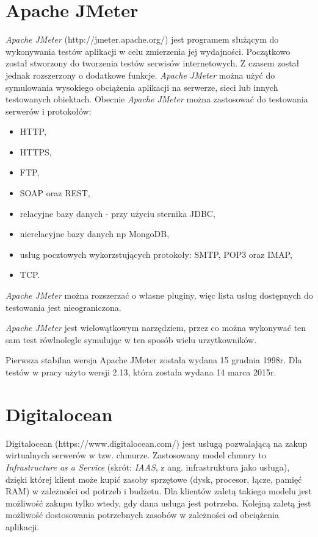 \section{Apache JMeter}
\textsl{Apache JMeter} (http://jmeter.apache.org/) jest programem służącym do wykonywania testów aplikacji w celu zmierzenia jej wydajności. Początkowo został stworzony do tworzenia testów serwisów internetowych. Z czasem został jednak rozszerzony o dodatkowe funkcje. \textsl{Apache JMeter} można użyć do symulowania wysokiego obciążenia aplikacji na serwerze, sieci lub innych testowanych obiektach.
Obecnie \textsl{Apache JMeter} można zastosować do testowania serwerów i protokołów:
\begin{itemize}
\item HTTP,
\item HTTPS,
\item FTP,
\item SOAP oraz REST,
\item relacyjne bazy danych - przy użyciu sternika JDBC,
\item nierelacyjne bazy danych np MongoDB,
\item usług pocztowych wykorzstujących protokoły: SMTP, POP3 oraz IMAP,
\item TCP.
\end{itemize}


\textsl{Apache JMeter} można rozszerzać o własne pluginy, więc lista usług dostępnych do testowania jest nieograniczona. 

\textsl{Apache JMeter} jest wielowątkowym narzędziem, przez co można  wykonywać ten sam test rówlnolegle symulując w ten sposób wielu urzytkowników. 

Pierwsza stabilna wersja Apache JMeter została wydana 15 grudnia 1998r.           Dla testów w pracy użyto wersji 2.13, która została wydana 14 marca 2015r.

\section{Digitalocean}
Digitalocean (https://www.digitalocean.com/) jest usługą pozwalającą na zakup wirtualnych serwerów w tzw. chmurze. Zastosowany model chmury to \textsl{Infrastructure as a Service} (skrót: \textsl{IAAS}, z ang. infrastruktura jako usługa), dzięki której klient może kupić zasoby sprzętowe (dysk, procesor, łącze, pamięć RAM) w zależności od potrzeb i budżetu. Dla klientów zaletą takiego modelu jest możliwość zakupu tylko wtedy, gdy dana usługa jest potrzeba. Kolejną zaletą jest możliwość dostosowania potrzebnych zasobów w zależności od obciążenia aplikacji.

